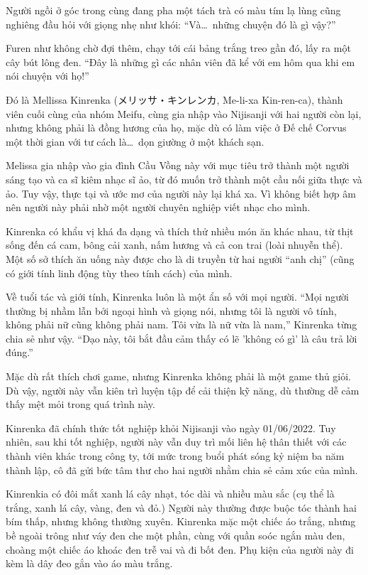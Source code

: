 \documentclass[../main.tex]{subfiles}
\begin{document}
\chrint


Người ngồi ở góc trong cùng đang pha một tách trà có màu tím lạ lùng cũng nghiêng đầu hỏi với giọng nhẹ như khói: ``Và\dots\ những chuyện đó là gì vậy?''

Furen như không chờ đợi thêm, chạy tới cái bảng trắng treo gần đó, lấy ra một cây bút lông đen. ``Đây là những gì các nhân viên đã kể với em hôm qua khi em nói chuyện với họ!''

\chrint

Đó là Mellissa Kinrenka (メリッサ・キンレンカ, Me-li-xa Kin-ren-ca), thành viên cuối cùng của nhóm Meifu, cùng gia nhập vào Nijisanji với hai người còn lại, nhưng không phải là đồng hương của họ, mặc dù có làm việc ở Đế chế Corvus một thời gian với tư cách là\dots\ dọn giường ở một khách sạn.

Melissa gia nhập vào gia đình Cầu Vồng này với mục tiêu trở thành một người sáng tạo và ca sĩ kiêm nhạc sĩ ảo, từ đó muốn trở thành một cầu nối giữa thực và ảo. Tuy vậy, thực tại và ước mơ của người này lại khá xa. Vì không biết hợp âm nên người này phải nhờ một người chuyên nghiệp viết nhạc cho mình.

Kinrenka có khẩu vị khá đa dạng và thích thử nhiều món ăn khác nhau, từ thịt sống đến cá cam, bông cải xanh, nấm hương và cả con trai (loài nhuyễn thể). Một số sở thích ăn uống này được cho là di truyền từ hai người ``anh chị'' (cũng có giới tính linh động tùy theo tính cách) của mình.

Về tuổi tác và giới tính, Kinrenka luôn là một ẩn số với mọi người. ``Mọi người thường bị nhầm lẫn bởi ngoại hình và giọng nói, nhưng tôi là người vô tính, không phải nữ cũng không phải nam. Tôi vừa là nữ vừa là nam,'' Kinrenka từng chia sẻ như vậy. ``Dạo này, tôi bắt đầu cảm thấy có lẽ 'không có gì' là câu trả lời đúng.''

Mặc dù rất thích chơi game, nhưng Kinrenka không phải là một game thủ giỏi. Dù vậy, người này vẫn kiên trì luyện tập để cải thiện kỹ năng, dù thường dễ cảm thấy mệt mỏi trong quá trình này.

Kinrenka đã chính thức tốt nghiệp khỏi Nijisanji vào ngày 01/06/2022. Tuy nhiên, sau khi tốt nghiệp, người này vẫn duy trì mối liên hệ thân thiết với các thành viên khác trong công ty, tới mức trong buổi phát sóng kỷ niệm ba năm thành lập, cô đã gửi bức tâm thư cho hai người nhằm chia sẻ cảm xúc của mình.

Kinrenkia có đôi mắt xanh lá cây nhạt, tóc dài và nhiều màu sắc (cụ thể là trắng, xanh lá cây, vàng, đen và đỏ.) Người này thường được buộc tóc thành hai bím thấp, nhưng không thường xuyên. Kinrenka mặc một chiếc áo trắng, nhưng bề ngoài trông như váy đen che một phần, cùng với quần soóc ngắn màu đen, choàng một chiếc áo khoác đen trễ vai và đi bốt đen. Phụ kiện của người này đi kèm là dây đeo gắn vào áo màu trắng.
\end{document}
